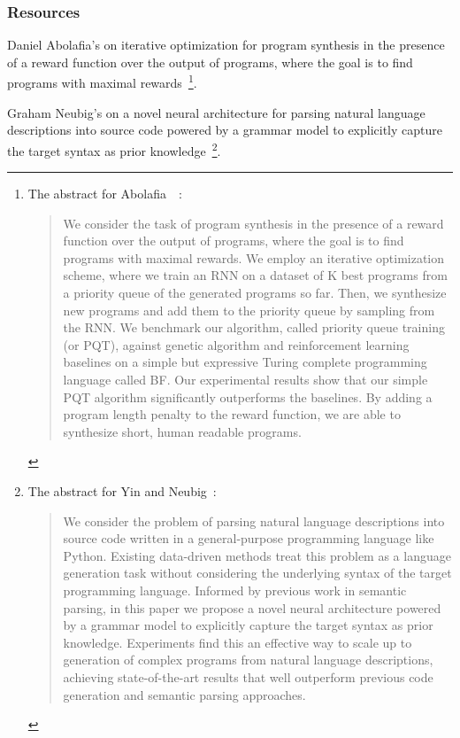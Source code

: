 
\subsubsection*{Resources}

Daniel Abolafia's {} on iterative optimization for program synthesis in the presence of a reward function over the output of programs, where the goal is to find programs with maximal rewards~\cite{AbolafiaetalCoRR-18}\footnote{%
%
  The abstract for Abolafia~\etal{}~\cite{AbolafiaetalCoRR-18}:
%
  \begin{quotation}
%
    We consider the task of program synthesis in the presence of a reward function over the output of programs, where the goal is to find programs with maximal rewards. We employ an iterative optimization scheme, where we train an RNN on a dataset of K best programs from a priority queue of the generated programs so far. Then, we synthesize new programs and add them to the priority queue by sampling from the RNN. We benchmark our algorithm, called priority queue training (or PQT), against genetic algorithm and reinforcement learning baselines on a simple but expressive Turing complete programming language called BF. Our experimental results show that our simple PQT algorithm significantly outperforms the baselines. By adding a program length penalty to the reward function, we are able to synthesize short, human readable programs.
%
  \end{quotation}}.

Graham Neubig's {} on a novel neural architecture for parsing natural language descriptions into source code powered by a grammar model to explicitly capture the target syntax as prior knowledge~\cite{YinandNeubigACL-17}\footnote{%
%
  The abstract for Yin and Neubig~\cite{YinandNeubigACL-17}:
%
  \begin{quotation}
%
    We consider the problem of parsing natural language descriptions into source code written in a general-purpose programming language like Python. Existing data-driven methods treat this problem as a language generation task without considering the underlying syntax of the target programming language. Informed by previous work in semantic parsing, in this paper we propose a novel neural architecture powered by a grammar model to explicitly capture the target syntax as prior knowledge. Experiments find this an effective way to scale up to generation of complex programs from natural language descriptions, achieving state-of-the-art results that well outperform previous code generation and semantic parsing approaches.
%
  \end{quotation}}.

